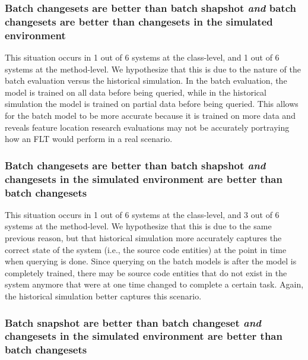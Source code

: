 \subsubsection{Batch changesets are better than batch shapshot
\emph{and} batch changesets are better than changesets in the simulated environment}

%

This situation occurs in 1 out of 6 systems at the class-level, and 1 out of 6
systems at the method-level.  We hypothesize that this is due to the nature of
the batch evaluation versus the historical simulation.  In the batch evaluation,
the model is trained on all data before being queried, while in the historical
simulation the model is trained on partial data before being queried.  This
allows for the batch model to be more accurate because it is trained on more
data and reveals feature location research evaluations may not be accurately
portraying how an FLT would perform in a real scenario.

\subsubsection{Batch changesets are better than batch shapshot
\emph{and} changesets in the simulated environment are better than batch changesets}

%

This situation occurs in 1 out of 6 systems at the class-level, and 3 out of 6
systems at the method-level.  We hypothesize that this is due to the same
previous reason, but that historical simulation more accurately captures the
correct state of the system (i.e., the source code entities) at the point in
time when querying is done.  Since querying on the batch models is after the
model is completely trained, there may be source code entities that do not exist
in the system anymore that were at one time changed to complete a certain task.
Again, the historical simulation better captures this scenario.

\subsubsection{Batch snapshot are better than batch changeset
\emph{and} changesets in the simulated environment are better than batch changesets}

